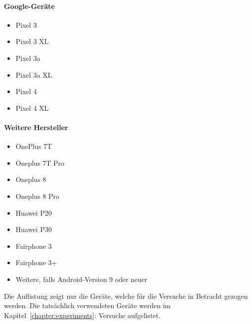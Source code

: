 \paragraph{Google-Geräte}
\begin{itemize}
    \item Pixel 3
    \item Pixel 3 XL
    \item Pixel 3a
    \item Pixel 3a XL
    \item Pixel 4
    \item Pixel 4 XL
\end{itemize}

\paragraph{Weitere Hersteller}
\begin{itemize}
    \item OnePlus 7T 
    \item Oneplus 7T Pro 
    \item Oneplus 8
    \item Oneplus 8 Pro
    \item Huawei P20
    \item Huawei P30
    \item Fairphone 3
    \item Fairphone 3+
    \item Weitere, falls Android-Version 9 oder neuer
\end{itemize}

Die Auflistung zeigt nur die Geräte, welche für die Versuche in 
Betracht gezogen werden. Die tatsächlich verwendeten Geräte 
werden im Kapitel~\ref{chapter:experiments}: Versuche aufgelistet.

\clearpage